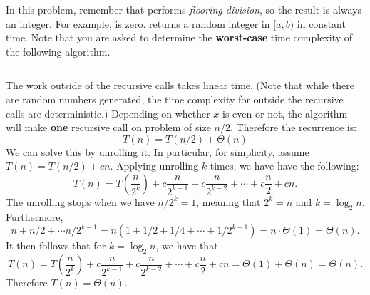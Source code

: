 \begin{prob}
\begin{subprobset}
\begin{subprob}
\begin{soln}
            \end{soln}
        \end{subprob}

        \begin{subprob}
            In this problem, remember that \python{//} performs \emph{flooring division},
            so the result is always an integer. For example,  is zero.
             returns a random integer in $[a,b)$ in constant time. Note that you are asked to determine the {\bf worst-case} time complexity of the following algorithm. 

            \inputminted{python}{\thisdir/include/part_c.py}

            \begin{soln}
                The work outside of the recursive calls takes linear time. (Note that while there are random numbers generated, the time complexity for outside the recursive calls are deterministic.) 
                Depending on whether $x$ is even or not, the algorithm will make {\bf one} recursive call on problem of size $n/2$. Therefore the recurrence is: 
                \[
                T(n) = T(n/2) + \Theta(n)
                \]
                We can solve this by unrolling it. In particular, for simplicity, assume $T(n) = T(n/2) + cn$. 
                Applying unrolling $k$ times, we have have the following: 
                \[ T(n) = T(\frac{n}{2^{k}}) + c \frac{n}{2^{k-1}} + c\frac{n}{2^{k-2}} + \cdots + c\frac{n}{2} + cn . \]
                The unrolling stops when we have $n / 2^k = 1$, meaning that $2^k = n$ and $k=\log_2 n$. Furthermore,  
                \[ n + n/2 + \cdots n/ 2^{k-1} = n (1 + 1/2 + 1/4 + \cdots + 1/2^{k-1}) = n \cdot \Theta(1) = \Theta(n).\]
                It then follows that for $k = \log_2 n$, we have that 
                \[T(n) = T(\frac{n}{2^{k}}) + c \frac{n}{2^{k-1}} + c\frac{n}{2^{k-2}} + \cdots + c\frac{n}{2} + cn = \Theta(1) + \Theta(n) = \Theta(n).\]
                Therefore $T(n) = \Theta(n)$. 
              
            \end{soln}
        \end{subprob}

    \end{subprobset}

\end{prob}
